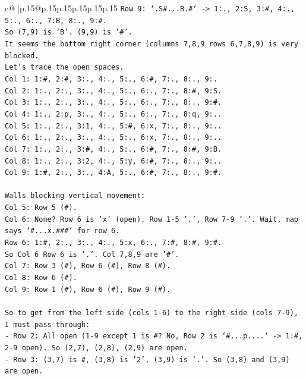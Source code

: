 \documentclass{article}
\begin{document}
{\begin{supertabular}{c@{$\;$}|p{.15\linewidth}@{}p{.15\linewidth}p{.15\linewidth}p{.15\linewidth}p{.15\linewidth}p{.15\linewidth}}
{{{\texttt{Row 9: `.S\#...B.\#` {-}> 1:., 2:S, 3:\#, 4:., 5:., 6:., 7:B, 8:., 9:\#.} \\
\texttt{So (7,9) is 'B'. (9,9) is '\#'.} \\
\texttt{It seems the bottom right corner (columns 7,8,9 rows 6,7,8,9) is very blocked.} \\
\texttt{Let's trace the open spaces.} \\
\texttt{Col 1: 1:\#, 2:\#, 3:., 4:., 5:., 6:\#, 7:., 8:., 9:.} \\
\texttt{Col 2: 1:., 2:., 3:., 4:., 5:., 6:., 7:., 8:\#, 9:S.} \\
\texttt{Col 3: 1:., 2:., 3:., 4:., 5:., 6:., 7:., 8:., 9:\#.} \\
\texttt{Col 4: 1:., 2:p, 3:., 4:., 5:., 6:., 7:., 8:q, 9:..} \\
\texttt{Col 5: 1:., 2:., 3:1, 4:., 5:\#, 6:x, 7:., 8:., 9:..} \\
\texttt{Col 6: 1:., 2:., 3:., 4:., 5:., 6:x, 7:., 8:., 9:..} \\
\texttt{Col 7: 1:., 2:., 3:\#, 4:., 5:., 6:\#, 7:., 8:\#, 9:B.} \\
\texttt{Col 8: 1:., 2:., 3:2, 4:., 5:y, 6:\#, 7:., 8:., 9:..} \\
\texttt{Col 9: 1:\#, 2:., 3:., 4:A, 5:., 6:\#, 7:., 8:., 9:\#.} \\
\\ 
\texttt{Walls blocking vertical movement:} \\
\texttt{Col 5: Row 5 (\#).} \\
\texttt{Col 6: None? Row 6 is 'x' (open). Row 1{-}5 '.', Row 7{-}9 '.'. Wait, map says `\#...x.\#\#\#` for row 6.} \\
\texttt{Row 6: 1:\#, 2:., 3:., 4:., 5:x, 6:., 7:\#, 8:\#, 9:\#.} \\
\texttt{So Col 6 Row 6 is '.'. Col 7,8,9 are '\#'.} \\
\texttt{Col 7: Row 3 (\#), Row 6 (\#), Row 8 (\#).} \\
\texttt{Col 8: Row 6 (\#).} \\
\texttt{Col 9: Row 1 (\#), Row 6 (\#), Row 9 (\#).} \\
\\ 
\texttt{So to get from the left side (cols 1{-}6) to the right side (cols 7{-}9), I must pass through:} \\
\texttt{{-} Row 2: All open (1{-}9 except 1 is \#? No, Row 2 is `\#...p....` {-}> 1:\#, 2{-}9 open). So (2,7), (2,8), (2,9) are open.} \\
\texttt{{-} Row 3: (3,7) is \#, (3,8) is '2', (3,9) is '.'. So (3,8) and (3,9) are open.} \\
}}}
\end{supertabular}}
\end{document}
